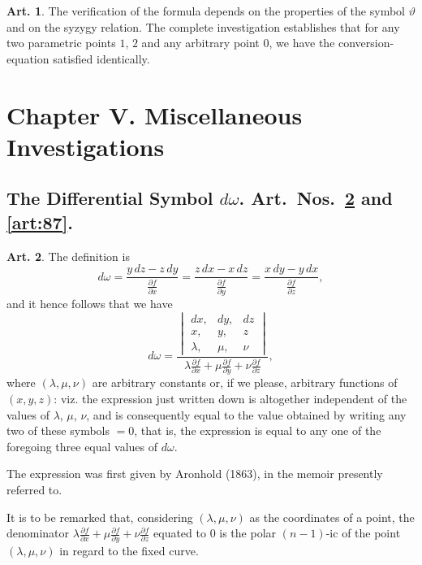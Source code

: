 \documentclass[12pt,a4paper]{article}
\theoremstyle{definition}
\newtheorem{art}{Art.}[section]
\begin{document}
\begin{art}\label{art:79}
The verification of the formula depends on the properties of the symbol $\vartheta$ and on the syzygy relation. The complete investigation establishes that for any two parametric points $1$, $2$ and any arbitrary point $0$, we have the conversion-equation satisfied identically.
\end{art}

\newpage
\section*{Chapter V. Miscellaneous Investigations}

\subsection*{The Differential Symbol $d\omega$. Art.~Nos.~\ref{art:86} and \ref{art:87}.}

\begin{art}\label{art:86}
The definition is
\[
d\omega = \frac{y\,dz - z\,dy}{\frac{\partial f}{\partial x}} = \frac{z\,dx - x\,dz}{\frac{\partial f}{\partial y}} = \frac{x\,dy - y\,dx}{\frac{\partial f}{\partial z}},
\]
and it hence follows that we have
\[
d\omega = \frac{\begin{vmatrix} dx, & dy, & dz \\ x, & y, & z \\ \lambda, & \mu, & \nu \end{vmatrix}}{\lambda\frac{\partial f}{\partial x} + \mu\frac{\partial f}{\partial y} + \nu\frac{\partial f}{\partial z}},
\]
where $(\lambda, \mu, \nu)$ are arbitrary constants or, if we please, arbitrary functions of $(x, y, z)$: viz. the expression just written down is altogether independent of the values of $\lambda$, $\mu$, $\nu$, and is consequently equal to the value obtained by writing any two of these symbols $= 0$, that is, the expression is equal to any one of the foregoing three equal values of $d\omega$.

The expression was first given by Aronhold (1863), in the memoir presently referred to.
\end{art}

\newpage
It is to be remarked that, considering $(\lambda, \mu, \nu)$ as the coordinates of a point, the denominator $\lambda\frac{\partial f}{\partial x} + \mu\frac{\partial f}{\partial y} + \nu\frac{\partial f}{\partial z}$ equated to $0$ is the polar $(n - 1)$-ic of the point $(\lambda, \mu, \nu)$ in regard to the fixed curve.
\end{document}
